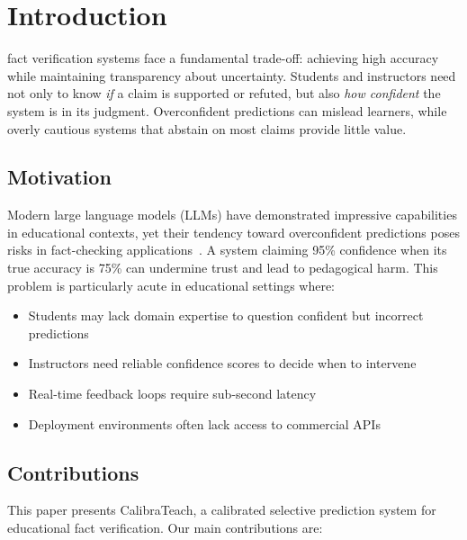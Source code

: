 \documentclass[journal]{IEEEtran}
\begin{document}

\section{Introduction}
 fact verification systems face a fundamental trade-off: achieving high accuracy while maintaining transparency about uncertainty. Students and instructors need not only to know \textit{if} a claim is supported or refuted, but also \textit{how confident} the system is in its judgment. Overconfident predictions can mislead learners, while overly cautious systems that abstain on most claims provide little value.

\subsection{Motivation}

Modern large language models (LLMs) have demonstrated impressive capabilities in educational contexts, yet their tendency toward overconfident predictions poses risks in fact-checking applications~\cite{Guo2017}. A system claiming 95\% confidence when its true accuracy is 75\% can undermine trust and lead to pedagogical harm. This problem is particularly acute in educational settings where:

\begin{itemize}
    \item Students may lack domain expertise to question confident but incorrect predictions
    \item Instructors need reliable confidence scores to decide when to intervene
    \item Real-time feedback loops require sub-second latency
    \item Deployment environments often lack access to commercial APIs
\end{itemize}

\subsection{Contributions}

This paper presents CalibraTeach, a calibrated selective prediction system for educational fact verification. Our main contributions are:
\end{document}
